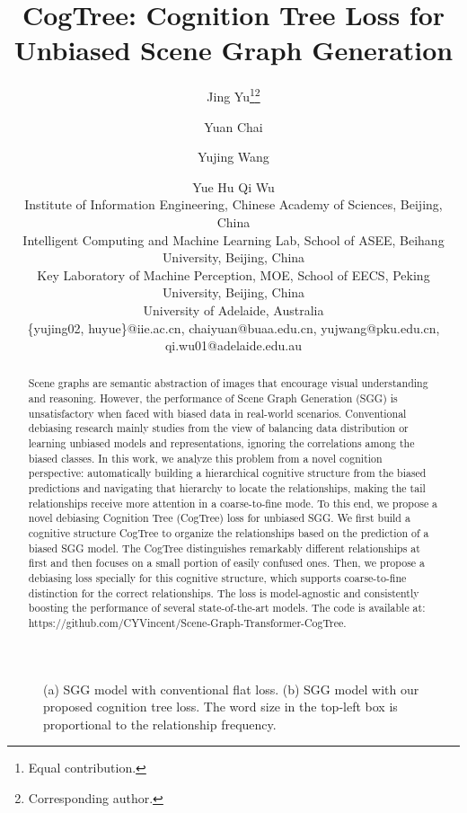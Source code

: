 \documentclass{article}
\title{CogTree: Cognition Tree Loss for Unbiased Scene Graph Generation}
\author{
Jing Yu\footnote{Equal contribution.}\footnote{Corresponding author.}\and
Yuan Chai\and
Yujing Wang\and
Yue Hu\And
Qi Wu \\
\affiliations
Institute of Information Engineering, Chinese Academy of Sciences, Beijing, China\\
Intelligent Computing and Machine Learning Lab, School of ASEE, Beihang University, Beijing, China \\
Key Laboratory of Machine Perception, MOE, School of EECS, Peking University, Beijing, China\\
University of Adelaide, Australia\\
\emails
\{yujing02, huyue\}@iie.ac.cn,
chaiyuan@buaa.edu.cn,
yujwang@pku.edu.cn,
qi.wu01@adelaide.edu.au
}
\begin{document}
\maketitle
\begin{abstract}

Scene graphs are semantic abstraction of images that encourage visual understanding and reasoning. However, the performance of Scene Graph Generation (SGG) is unsatisfactory when faced with biased data in real-world scenarios. Conventional debiasing research mainly studies from the view of  balancing data distribution or learning unbiased models and representations, ignoring the correlations among the biased classes. In this work, we analyze this problem from a novel cognition perspective: automatically building a hierarchical cognitive structure from the biased predictions and navigating that hierarchy to locate the relationships, making the tail relationships receive more attention in a coarse-to-fine mode. To this end, we propose a novel debiasing Cognition Tree (CogTree) loss for unbiased SGG. We first build a cognitive structure CogTree to organize the relationships based on the prediction of a biased SGG model. The CogTree distinguishes remarkably different relationships at first and then focuses on a small  portion  of  easily  confused  ones. Then, we propose a 
debiasing loss specially for this cognitive structure, which supports coarse-to-fine distinction for the correct relationships. The loss is model-agnostic and  consistently boosting the performance of several state-of-the-art models.  The code is available at: https://github.com/CYVincent/Scene-Graph-Transformer-CogTree.
\end{abstract}


\begin{figure}[t]
    \centering
    \caption{(a) SGG model with conventional flat loss. (b) SGG model with our proposed cognition tree loss. The word size in the top-left box is proportional to the relationship frequency.}
    \label{fig:comparison}
\end{figure}
\end{document}
